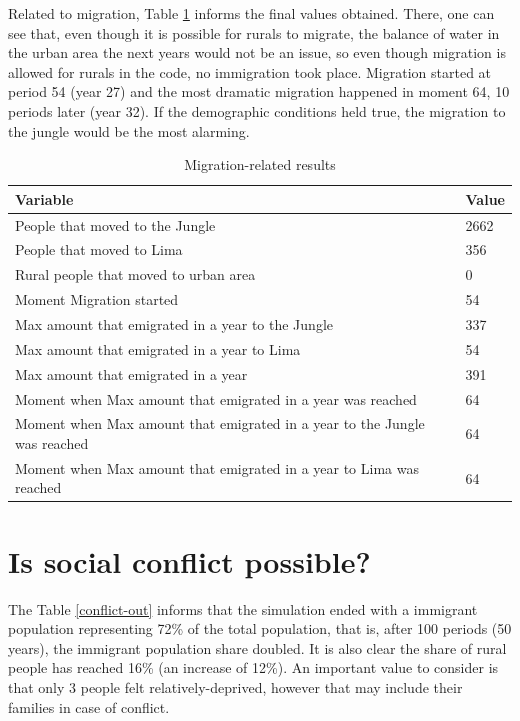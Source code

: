 \documentclass[doc,12pt,floatsintext]{apa7}
\begin{document}
Related to migration, Table \ref{migra-out} informs the final values obtained. There, one can see that, even though it is possible for rurals to migrate, the balance of water in the urban area the next years would not be an issue, so even though migration is allowed for rurals in the code, no immigration took place. Migration started at period 54 (year 27) and the most dramatic migration happened in moment 64, 10 periods later (year 32). If the demographic conditions held true, the migration to the jungle would be the most alarming.

\begin{table}[ht]
\renewcommand{\arraystretch}{1.5}
  \caption{Migration-related results}
{\scriptsize
\begin{tabular}{m{5in}p{0.5in}}
  \hline
Variable & Value  \\
  \hline
People that moved to the Jungle & 2662 \\
  People that moved to Lima & 356 \\
  Rural people that moved to urban area &   0 \\
  Moment Migration started &  54 \\
  Max amount that emigrated in a year to the Jungle & 337 \\
  Max amount that emigrated in a year to Lima &  54 \\
  Max amount that emigrated in a year & 391 \\
  Moment when Max amount that emigrated in a year was reached &  64 \\
  Moment when Max amount that emigrated in a year to the Jungle was reached &  64  \\
  Moment when Max amount that emigrated in a year to Lima was reached &  64 \\
   \hline
\end{tabular}}
\label{migra-out}
\end{table}


\section {Is social conflict possible?}


The Table \ref{conflict-out} informs that the simulation ended with a immigrant  population representing 72\% of the total population, that is, after 100 periods (50 years), the immigrant population share doubled. It is also clear the share of rural people has reached 16\% (an increase of 12\%). An important value to consider is that only 3 people felt relatively-deprived, however that may include their families in case of conflict.
\end{document}
